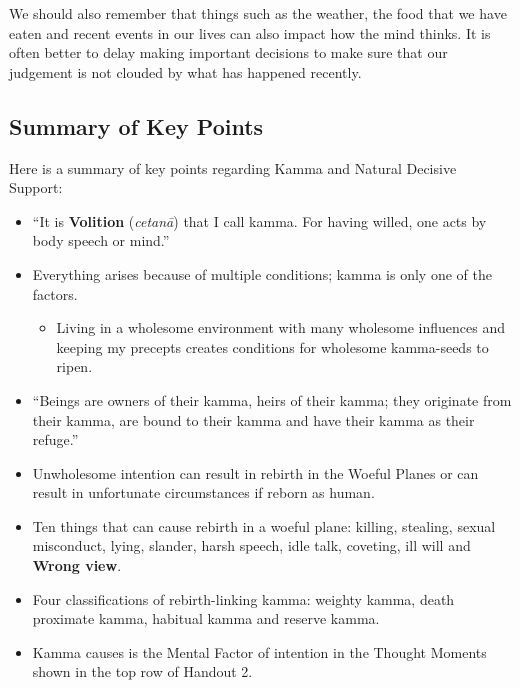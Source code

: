 We should also remember that things such as the weather, the food that we have eaten and recent events in our lives can also impact how the mind thinks. It is often better to delay making important decisions to make sure that our judgement is not clouded by what has happened recently.

\subsection*{Summary of Key Points}

Here is a summary of key points regarding Kamma and Natural Decisive Support:

\begin{itemize}

\item “It is \textbf{Volition} (\textit{cetanā}) that I call kamma. For having willed, one acts by body speech or mind.”

\item Everything arises because of multiple conditions; kamma is only one of the factors.

\begin{itemize}

\item Living in a wholesome environment with many wholesome influences and keeping my precepts creates conditions for wholesome kamma-seeds to ripen.

\end{itemize}

\item “Beings are owners of their kamma, heirs of their kamma; they originate from their kamma, are bound to their kamma and have their kamma as their refuge.”

\item Unwholesome intention can result in rebirth in the Woeful Planes or can result in unfortunate circumstances if reborn as human.

\item Ten things that can cause rebirth in a woeful plane: killing, stealing, sexual misconduct, lying, slander, harsh speech, idle talk, coveting, ill will and \textbf{Wrong view}.

\item Four classifications of rebirth-linking kamma: weighty kamma, death proximate kamma, habitual kamma and reserve kamma.

\item Kamma causes is the Mental Factor of intention in the Thought Moments shown in the top row of Handout 2.


\end{itemize}
